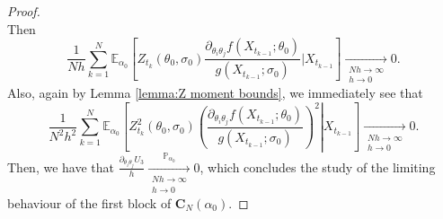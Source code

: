 \documentclass[a4paper,12pt]{article}
\numberwithin{equation}{section}
\theoremstyle{plain}
\theoremstyle{definition}
\begin{document}
\begin{appendix}
\begin{proof}
\begin{equation*}
    \end{equation*}
    Then
    \begin{equation*}
        \frac{1}{Nh}\sum_{k=1}^N \mathbb{E}_{\alpha_0}\left[Z_{t_k}(\theta_0,\sigma_0)\frac{\partial_{\theta_i\theta_j}f(X_{t_{k-1}};\theta_0)}{g(X_{t_{k-1}};\sigma_0)}|X_{t_{k-1}}\right]\xrightarrow[\substack{N h\rightarrow\infty \\ h \rightarrow 0}]{}0.
    \end{equation*}
    Also, again by Lemma \ref{lemma:Z moment bounds}, we immediately  see that 
    \begin{equation*}
         \frac{1}{N^2h^2}\sum_{k=1}^N \mathbb{E}_{\alpha_0}\left[Z^2_{t_k}(\theta_0,\sigma_0)\left.\left(\frac{\partial_{\theta_i\theta_j}f(X_{t_{k-1}};\theta_0)}{g(X_{t_{k-1}};\sigma_0)}\right)^2\right|X_{t_{k-1}}\right]\xrightarrow[\substack{N h\rightarrow\infty \\ h \rightarrow 0}]{}0.
    \end{equation*}
    Then, we have that $\frac{\partial_{\theta_i\theta_j}U_3}{h}\xrightarrow[\substack{N h\rightarrow\infty \\ h \rightarrow 0}]{\mathbb{P}_{\alpha_0}}0$, which concludes the study of the limiting behaviour of the first block of $\mathbf{C}_N(\alpha_0)$.
    

\end{proof}
\end{appendix}
\end{document}
